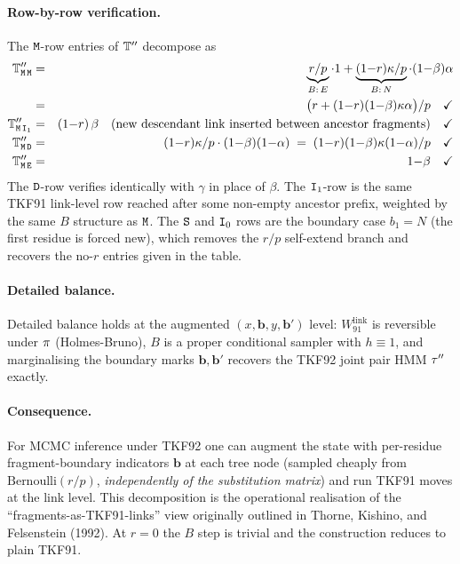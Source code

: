 \paragraph{Row-by-row verification.}  The ${\tt M}$-row entries of
$\mathbb{T}''$ decompose as
\begin{eqnarray*}
\mathbb{T}''_{{\tt M}\,{\tt M}}   & = & \underbrace{r/p}_{B:\,E} \cdot 1 + \underbrace{(1{-}r)\kappa/p}_{B:\,N} \cdot (1{-}\beta)\alpha \\
                          & = & \bigl(r + (1{-}r)(1{-}\beta)\kappa\alpha\bigr)/p \quad\checkmark \\
\mathbb{T}''_{{\tt M}\,{\tt I}_1} & = & (1{-}r)\,\beta \quad \text{(new descendant link inserted between ancestor fragments)} \quad\checkmark \\
\mathbb{T}''_{{\tt M}\,{\tt D}}   & = & (1{-}r)\kappa/p \cdot (1{-}\beta)(1{-}\alpha) \;=\; (1{-}r)(1{-}\beta)\kappa(1{-}\alpha)/p \quad\checkmark \\
\mathbb{T}''_{{\tt M}\,{\tt E}}   & = & 1{-}\beta \quad\checkmark
\end{eqnarray*}
The ${\tt D}$-row verifies identically with $\gamma$ in place of $\beta$.  The
${\tt I}_1$-row is the same TKF91 link-level row reached after some non-empty
ancestor prefix, weighted by the same $B$ structure as ${\tt M}$.  The
${\tt S}$ and ${\tt I}_0$ rows are the boundary case $b_1 = N$ (the first
residue is forced new), which removes the $r/p$ self-extend branch
and recovers the no-$r$ entries given in the table.

\paragraph{Detailed balance.}  Detailed balance holds at the augmented
$(x,\mathbf{b},y,\mathbf{b}')$ level: $W_{91}^{\text{link}}$ is reversible
under $\pi$ (Holmes-Bruno), $B$ is a proper conditional sampler with
$h \equiv 1$, and marginalising the boundary marks $\mathbf{b}, \mathbf{b}'$
recovers the TKF92 joint pair HMM
$\tau''$ exactly.

\paragraph{Consequence.}  For MCMC inference under TKF92 one can
augment the state with per-residue fragment-boundary indicators
$\mathbf{b}$ at each tree node (sampled cheaply from
$\text{Bernoulli}(r/p)$, {\em independently of the substitution
matrix\/}) and run TKF91 moves at the link level.  This decomposition
is the operational realisation of the ``fragments-as-TKF91-links''
view originally outlined in Thorne, Kishino, and Felsenstein (1992).
At $r = 0$ the $B$ step is trivial and the construction reduces to
plain TKF91.
